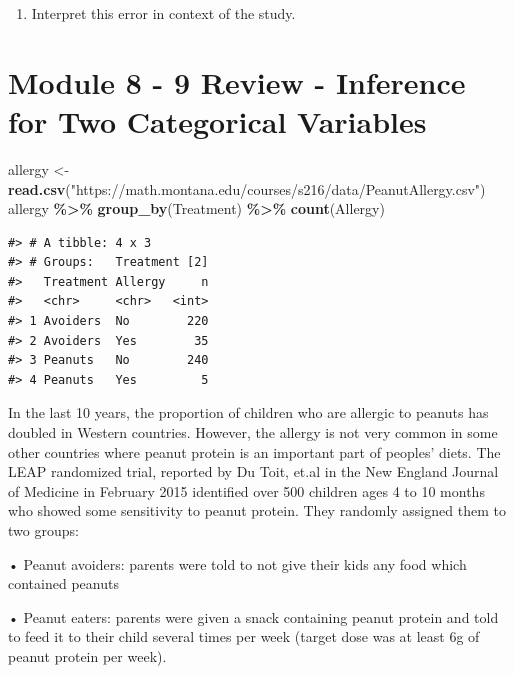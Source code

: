\documentclass[
]{report}
\newenvironment{Shaded}{\begin{snugshade}}{\end{snugshade}}
\newcommand{\FunctionTok}[1]{\textcolor[rgb]{0.13,0.29,0.53}{\textbf{#1}}}
\newcommand{\NormalTok}[1]{#1}
\newcommand{\OtherTok}[1]{\textcolor[rgb]{0.56,0.35,0.01}{#1}}
\newcommand{\SpecialCharTok}[1]{\textcolor[rgb]{0.81,0.36,0.00}{\textbf{#1}}}
\newcommand{\StringTok}[1]{\textcolor[rgb]{0.31,0.60,0.02}{#1}}
\providecommand{\tightlist}{%
  \setlength{\itemsep}{0pt}\setlength{\parskip}{0pt}}
\begin{document}
\vspace{0.3in}

\begin{enumerate}
\def\labelenumi{\arabic{enumi}.}
\setcounter{enumi}{8}
\tightlist
\item
  Interpret this error in context of the study.
\end{enumerate}

\newpage

\section{Module 8 - 9 Review - Inference for Two Categorical Variables}\label{module-8---9-review---inference-for-two-categorical-variables}

\begin{Shaded}
\begin{Highlighting}[]
\NormalTok{allergy }\OtherTok{\textless{}{-}} \FunctionTok{read.csv}\NormalTok{(}\StringTok{"https://math.montana.edu/courses/s216/data/PeanutAllergy.csv"}\NormalTok{) }
\NormalTok{allergy }\SpecialCharTok{\%\textgreater{}\%} \FunctionTok{group\_by}\NormalTok{(Treatment) }\SpecialCharTok{\%\textgreater{}\%} \FunctionTok{count}\NormalTok{(Allergy)}
\end{Highlighting}
\end{Shaded}

\begin{verbatim}
#> # A tibble: 4 x 3
#> # Groups:   Treatment [2]
#>   Treatment Allergy     n
#>   <chr>     <chr>   <int>
#> 1 Avoiders  No        220
#> 2 Avoiders  Yes        35
#> 3 Peanuts   No        240
#> 4 Peanuts   Yes         5
\end{verbatim}

In the last 10 years, the proportion of children who are allergic to peanuts has doubled in Western countries. However, the allergy is not very common in some other countries where peanut protein is an important part of peoples' diets. The LEAP randomized trial, reported by Du Toit, et.al in the New England Journal of Medicine in February 2015 identified over 500 children ages 4 to 10 months who showed some sensitivity to peanut protein. They randomly assigned them to two groups:

• Peanut avoiders: parents were told to not give their kids any food which contained peanuts

• Peanut eaters: parents were given a snack containing peanut protein and told to feed it to their child several times per week (target dose was at least 6g of peanut protein per week).
\end{document}
